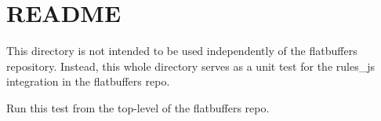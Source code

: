 \chapter{README}
\hypertarget{md_flatbuffers_2tests_2ts_2bazel__repository__test__dir_2README}{}\label{md_flatbuffers_2tests_2ts_2bazel__repository__test__dir_2README}
This directory is not intended to be used independently of the flatbuffers repository. Instead, this whole directory serves as a unit test for the {\ttfamily rules\+\_\+js} integration in the flatbuffers repo.

Run this test from the top-\/level of the flatbuffers repo. 
\begin{DoxyCode}{0}

\end{DoxyCode}
 